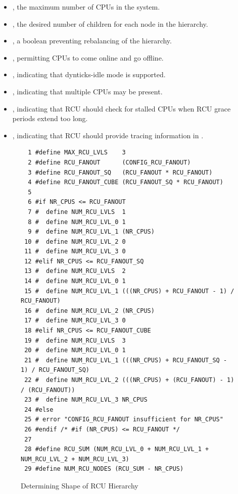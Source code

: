 \begin{itemize}
\item	{}, the maximum number of CPUs in the system.
\item	{}, the desired number of children for
	each node in the  hierarchy.
\item	{}, a boolean preventing rebalancing
	of the  hierarchy.
\item	{}, permitting CPUs to come online and go
	offline.
\item	{}, indicating that dynticks-idle mode is supported.
\item	{}, indicating that multiple CPUs may be present.
\item	{}, indicating that RCU should
	check for stalled CPUs when RCU grace periods extend too long.
\item	{}, indicating that RCU should provide
	tracing information in .
\end{itemize}

\begin{figure}[tbp]
{
\begin{verbatim}
  1 #define MAX_RCU_LVLS    3
  2 #define RCU_FANOUT      (CONFIG_RCU_FANOUT)
  3 #define RCU_FANOUT_SQ   (RCU_FANOUT * RCU_FANOUT)
  4 #define RCU_FANOUT_CUBE (RCU_FANOUT_SQ * RCU_FANOUT)
  5
  6 #if NR_CPUS <= RCU_FANOUT
  7 #  define NUM_RCU_LVLS  1
  8 #  define NUM_RCU_LVL_0 1
  9 #  define NUM_RCU_LVL_1 (NR_CPUS)
 10 #  define NUM_RCU_LVL_2 0
 11 #  define NUM_RCU_LVL_3 0
 12 #elif NR_CPUS <= RCU_FANOUT_SQ
 13 #  define NUM_RCU_LVLS  2
 14 #  define NUM_RCU_LVL_0 1
 15 #  define NUM_RCU_LVL_1 (((NR_CPUS) + RCU_FANOUT - 1) / RCU_FANOUT)
 16 #  define NUM_RCU_LVL_2 (NR_CPUS)
 17 #  define NUM_RCU_LVL_3 0
 18 #elif NR_CPUS <= RCU_FANOUT_CUBE
 19 #  define NUM_RCU_LVLS  3
 20 #  define NUM_RCU_LVL_0 1
 21 #  define NUM_RCU_LVL_1 (((NR_CPUS) + RCU_FANOUT_SQ - 1) / RCU_FANOUT_SQ)
 22 #  define NUM_RCU_LVL_2 (((NR_CPUS) + (RCU_FANOUT) - 1) / (RCU_FANOUT))
 23 #  define NUM_RCU_LVL_3 NR_CPUS
 24 #else
 25 # error "CONFIG_RCU_FANOUT insufficient for NR_CPUS"
 26 #endif /* #if (NR_CPUS) <= RCU_FANOUT */
 27
 28 #define RCU_SUM (NUM_RCU_LVL_0 + NUM_RCU_LVL_1 + NUM_RCU_LVL_2 + NUM_RCU_LVL_3)
 29 #define NUM_RCU_NODES (RCU_SUM - NR_CPUS)
\end{verbatim}
}
\caption{Determining Shape of RCU Hierarchy}
\label{fig:app:rcuimpl:rcutreewt:Determining Shape of RCU Hierarchy}
\end{figure}

